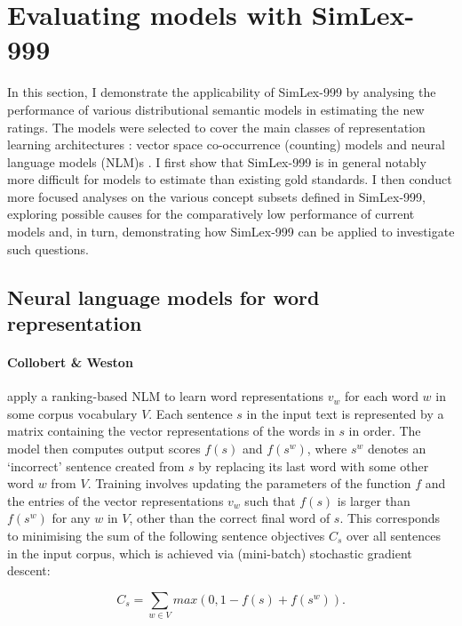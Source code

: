 \section{Evaluating models with SimLex-999}
\label{evaluation}

In this section, I demonstrate the applicability of SimLex-999 by analysing the performance of various distributional semantic models in estimating the new ratings. The models were selected to cover the main classes of representation learning architectures \citep{baroni2014don}: vector space co-occurrence (counting) models and neural language models (NLM)s \citep{Bengio2003lm}. I first show that SimLex-999 is in general notably more difficult for models to estimate than existing gold standards. I then conduct more focused analyses on the various concept subsets defined in SimLex-999, exploring possible causes for the comparatively low performance of current models and, in turn, demonstrating how SimLex-999 can be applied to investigate such questions.    

\subsection{Neural language models for word representation}
\label{prev}

\paragraph{\bf Collobert \& Weston}

\cite{collobert2008unified} apply a ranking-based NLM to learn word representations \(v_w\) for each word \(w\) in some corpus vocabulary \( V\). Each sentence \( s\) in the input text is represented by a matrix containing the vector representations of the words in \(s\) in order. The model then computes output scores \(f(s) \) and \(f(s^w) \), where \(s^w\) denotes an `incorrect' sentence created from \(s\) by replacing its last word with some other word \( w\) from \(V\). Training involves updating the parameters of the function \(f\) and the entries of the vector representations \(v_w\) such that  \(f(s)\) is larger than \(f(s^w) \) for any \(w\) in \(V\), other than the correct final word of \(s\). This corresponds to minimising the sum of the following sentence objectives \( C_s\) over all sentences in the input corpus, which is achieved via (mini-batch) stochastic gradient descent:

\[ C_{s}  = \sum_{w \in V} max(0,1-f(s) + f(s^w)). \]


